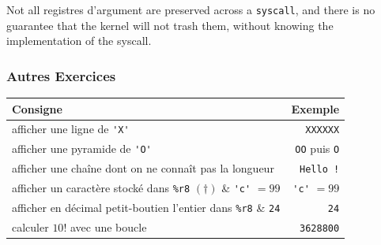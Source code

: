 \begin{remark}
  Not all registres d'argument are preserved across a \verb|syscall|, and there
  is no guarantee that the kernel will not trash them, without knowing the
  implementation of the syscall.
\end{remark}

\subsubsection{Autres Exercices}
\begin{center}
  \begin{tabular}{l r}
    \toprule
    Consigne & Exemple \\
    \midrule
    afficher une ligne de \verb|'X'| & \verb|XXXXXX| \\
    afficher une pyramide de \verb|'O'| & \verb|OO| puis \verb|O| \\
    afficher une chaîne dont on ne connaît pas la longueur & \verb|Hello !| \\
    afficher un caractère stocké dans \verb|%r8| $(\dagger)$ & \verb|'c'| $= 99$ \\
    afficher en décimal petit-boutien l'entier dans \verb|%r8| & \verb|24| \\
    calculer $10!$ avec une boucle & \verb|3628800| \\
    \bottomrule
  \end{tabular}
\end{center}
